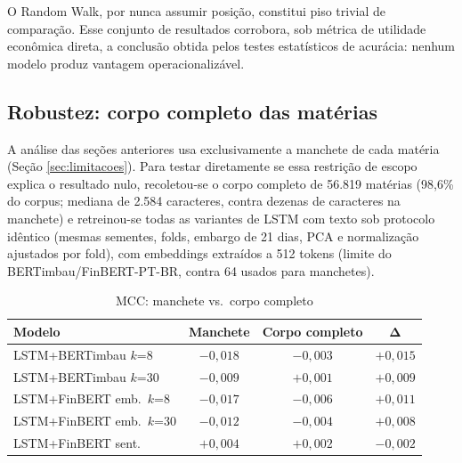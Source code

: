 \documentclass[conference]{IEEEtran}
\begin{document}
O Random Walk, por nunca assumir posi\c{c}\~ao, constitui piso trivial de compara\c{c}\~ao. Esse conjunto de resultados corrobora, sob m\'etrica de utilidade econ\^omica direta, a conclus\~ao obtida pelos testes estat\'isticos de acur\'acia: nenhum modelo produz vantagem operacionaliz\'avel.

\subsection{Robustez: corpo completo das mat\'erias}
\label{sec:corpo-completo}

A an\'alise das se\c{c}\~oes anteriores usa exclusivamente a manchete de cada mat\'eria (Se\c{c}\~ao \ref{sec:limitacoes}). Para testar diretamente se essa restri\c{c}\~ao de escopo explica o resultado nulo, recoletou-se o corpo completo de 56.819 mat\'erias (98,6\% do corpus; mediana de 2.584 caracteres, contra dezenas de caracteres na manchete) e retreinou-se todas as variantes de LSTM com texto sob protocolo id\^entico (mesmas sementes, folds, embargo de 21 dias, PCA e normaliza\c{c}\~ao ajustados por fold), com embeddings extra\'idos a 512 tokens (limite do BERTimbau/FinBERT-PT-BR, contra 64 usados para manchetes).

\begin{table}[htbp]
\caption{MCC: manchete vs.\ corpo completo}
\begin{center}
\begin{tabular}{lccc}
\toprule
\textbf{Modelo} & \textbf{Manchete} & \textbf{Corpo completo} & $\boldsymbol{\Delta}$ \\
\midrule
LSTM+BERTimbau $k$=8  & $-0{,}018$ & $-0{,}003$ & $+0{,}015$ \\
LSTM+BERTimbau $k$=30 & $-0{,}009$ & $+0{,}001$ & $+0{,}009$ \\
LSTM+FinBERT emb.\ $k$=8  & $-0{,}017$ & $-0{,}006$ & $+0{,}011$ \\
LSTM+FinBERT emb.\ $k$=30 & $-0{,}012$ & $-0{,}004$ & $+0{,}008$ \\
LSTM+FinBERT sent.\   & $+0{,}004$ & $+0{,}002$ & $-0{,}002$ \\
\bottomrule
\end{tabular}
\label{tab:corpo-completo}
\end{center}
\end{table}
\end{document}
